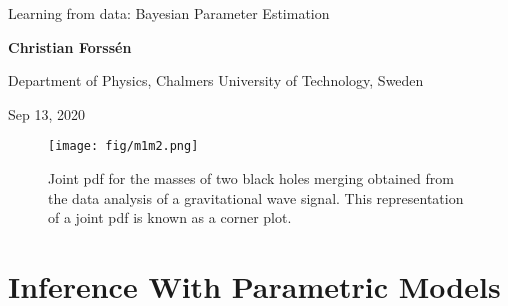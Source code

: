 \documentclass[%
oneside,                 %
final,                   %
10pt]{article}
\begin{document}

\newcommand{\exercisesection}[1]{\subsection*{#1}}







\thispagestyle{empty}

\begin{center}
{\LARGE\bf
\begin{spacing}{1.25}
Learning from data: Bayesian Parameter Estimation
\end{spacing}
}
\end{center}


\begin{center}
{\bf Christian Forssén}
\end{center}

    \begin{center}
\centerline{{\small Department of Physics, Chalmers University of Technology, Sweden}}
\end{center}
    

\begin{center}
Sep 13, 2020
\end{center}

\vspace{1cm}



\begin{figure}[!ht]  %
  \centerline{\texttt{[image: fig/m1m2.png]}}
  \caption{
  Joint pdf for the masses of two black holes merging obtained from the data analysis of a gravitational wave signal. This representation of a joint pdf is known as a corner plot. \label{fig:gw}
  }
\end{figure}


\section{Inference With Parametric Models}
\end{document}
